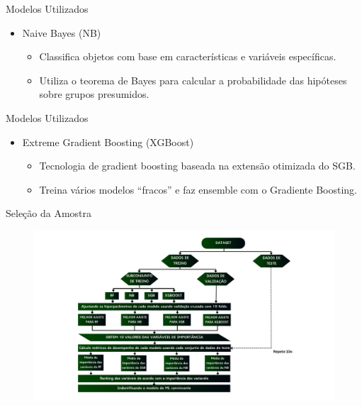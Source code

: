 \begin{frame}{Modelos Utilizados}
	\begin{itemize}
		\item Naive Bayes (NB)
		\begin{itemize}
			\item Classifica objetos com base em características e variáveis específicas.
			\item Utiliza o teorema de Bayes para calcular a probabilidade das hipóteses sobre grupos presumidos.
		\end{itemize}
	\end{itemize}
\end{frame}

\begin{frame}{Modelos Utilizados}
	\begin{itemize}
		\item Extreme Gradient Boosting (XGBoost)
		\begin{itemize}
			\item Tecnologia de gradient boosting baseada na extensão otimizada do SGB.
			\item Treina vários modelos “fracos” e faz ensemble com o Gradiente Boosting.
		\end{itemize}
	\end{itemize}
\end{frame}

\begin{frame}{Seleção da Amostra}
	\vspace{-1cm}
	
	\begin{figure}[h]	
		\includegraphics[width=1.2\linewidth, height = !]{imagens//secao3/mlesquema.png}
	\end{figure}
\end{frame}

